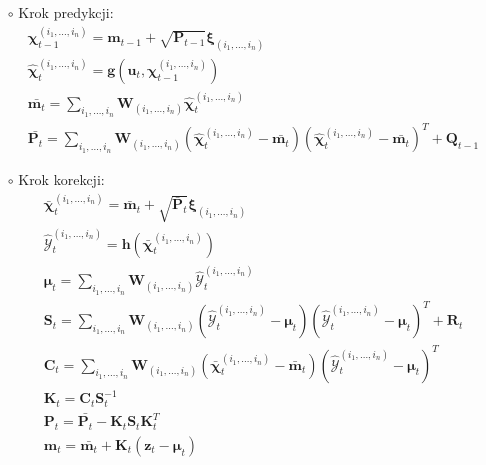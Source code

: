 \begin{itemize}
	\item[$\circ$] Krok predykcji:
	\begin{align}\label{eq:GHKFAdditivePrediction}
	&\boldsymbol{\chi}^{(i_1, \dots, i_n)}_{t-1}=\boldsymbol{m}_{t-1}+\sqrt{\boldsymbol{P}_{t-1}}\boldsymbol{\xi}_{(i_1, \dots, i_n)} \nonumber \\
	&\hat{\boldsymbol{\chi}}^{(i_1, \dots, i_n)}_{t}=\boldsymbol{g}(\boldsymbol{u}_t, \boldsymbol{\chi}^{(i_1, \dots, i_n)}_{t-1}) \nonumber \\
	&\bar{\boldsymbol{m}_t}=\sum_{i_1,\dots,i_n} \boldsymbol{W}_{(i_1, \dots, i_n)} \hat{\boldsymbol{\chi}}^{(i_1, \dots, i_n)}_{t} \nonumber \\
	&\bar{\boldsymbol{P}_t}=\sum_{i_1,\dots,i_n} \boldsymbol{W}_{(i_1, \dots, i_n)}(\hat{\boldsymbol{\chi}}^{(i_1, \dots, i_n)}_{t} - \bar{\boldsymbol{m}_t})(\hat{\boldsymbol{\chi}}^{(i_1, \dots, i_n)}_{t} - \bar{\boldsymbol{m}_t})^T + \boldsymbol{Q}_{t-1}
	\end{align}
	\item[$\circ$] Krok korekcji:
	\begin{align} \label{eq:GHKFAdditiveCorrection}
	&\bar{\boldsymbol{\chi}}^{(i_1, \dots, i_n)}_{t} = \bar{\boldsymbol{m}}_{t} + \sqrt{\bar{\boldsymbol{P}}_{t}} \boldsymbol{\xi}_{(i_1, \dots, i_n)} \nonumber \\
	&\hat{\boldsymbol{\mathcal{Y}}}^{(i_1, \dots, i_n)}_{t} = \boldsymbol{h}(\bar{\boldsymbol{\chi}}^{(i_1, \dots, i_n)}_{t}) \nonumber \\
	&\boldsymbol{\mu}_t=\sum_{i_1,\dots,i_n} \boldsymbol{W}_{(i_1, \dots, i_n)} \hat{\boldsymbol{\mathcal{Y}}}^{(i_1, \dots, i_n)}_{t} \nonumber \\
	&\boldsymbol{S}_t=\sum_{i_1,\dots,i_n} \boldsymbol{W}_{(i_1, \dots, i_n)}(\hat{\boldsymbol{\mathcal{Y}}}^{(i_1, \dots, i_n)}_{t} - \boldsymbol{\mu}_t)(\hat{\boldsymbol{\mathcal{Y}}}^{(i_1, \dots, i_n)}_{t} - \boldsymbol{\mu}_t)^T + \boldsymbol{R}_{t} \nonumber \\
	&\boldsymbol{C}_t = \sum_{i_1,\dots,i_n} \boldsymbol{W}_{(i_1, \dots, i_n)} (\bar{\boldsymbol{\chi}}^{(i_1, \dots, i_n)}_{t} - \bar{\boldsymbol{m}}_t)(\hat{\boldsymbol{\mathcal{Y}}}^{(i_1, \dots, i_n)}_{t} - \boldsymbol{\mu}_t)^T \nonumber \\
	&\boldsymbol{K}_t=\boldsymbol{C}_t\boldsymbol{S}_t^{-1} \nonumber \\
	&\boldsymbol{P}_t=\bar{\mathbf{P}_{t}} - \boldsymbol{K}_t\boldsymbol{S}_t\boldsymbol{K}_t^T \nonumber \\
	&\boldsymbol{m}_t = \bar{\boldsymbol{m}_t} + \boldsymbol{K}_t(\boldsymbol{z}_t - \boldsymbol{\mu}_t)
	\end{align}
\end{itemize}

